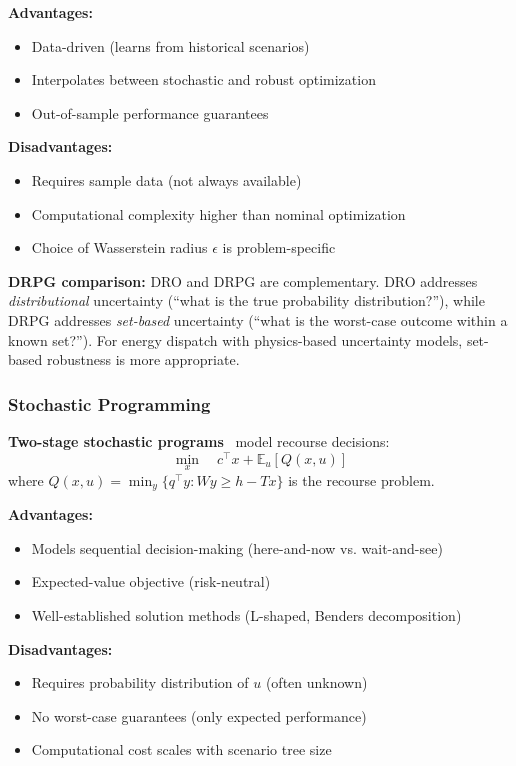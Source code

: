 \textbf{Advantages:}
\begin{itemize}
    \item Data-driven (learns from historical scenarios)
    \item Interpolates between stochastic and robust optimization
    \item Out-of-sample performance guarantees
\end{itemize}

\textbf{Disadvantages:}
\begin{itemize}
    \item Requires sample data (not always available)
    \item Computational complexity higher than nominal optimization
    \item Choice of Wasserstein radius $\epsilon$ is problem-specific
\end{itemize}

\textbf{DRPG comparison:} DRO and DRPG are complementary. DRO addresses \emph{distributional} uncertainty (``what is the true probability distribution?''), while DRPG addresses \emph{set-based} uncertainty (``what is the worst-case outcome within a known set?''). For energy dispatch with physics-based uncertainty models, set-based robustness is more appropriate.

\subsubsection{Stochastic Programming}

\textbf{Two-stage stochastic programs}~\cite{Birge2011} model recourse decisions:
\begin{equation}
\min_x \quad c^\top x + \mathbb{E}_u [Q(x, u)]
\end{equation}
where $Q(x, u) = \min_y \{q^\top y : W y \geq h - T x\}$ is the recourse problem.

\textbf{Advantages:}
\begin{itemize}
    \item Models sequential decision-making (here-and-now vs. wait-and-see)
    \item Expected-value objective (risk-neutral)
    \item Well-established solution methods (L-shaped, Benders decomposition)
\end{itemize}

\textbf{Disadvantages:}
\begin{itemize}
    \item Requires probability distribution of $u$ (often unknown)
    \item No worst-case guarantees (only expected performance)
    \item Computational cost scales with scenario tree size
\end{itemize}

